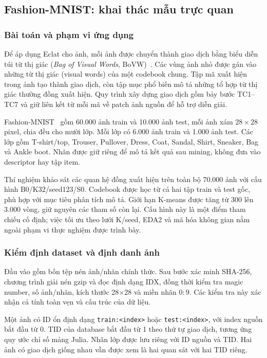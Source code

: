 \subsection{Fashion-MNIST: khai thác mẫu trực quan}
\label{sec:fashion}
\subsubsection{Bài toán và phạm vi ứng dụng}
Để áp dụng Eclat cho ảnh, mỗi ảnh được chuyển thành giao dịch bằng
biểu diễn túi từ thị giác (\textit{Bag of Visual Words}, BoVW)~\cite{Sivic03}.
Các vùng ảnh nhỏ được gán vào những từ thị giác (visual words) của một
codebook chung. Tập mã xuất hiện trong ảnh tạo thành giao dịch, còn tập
mục phổ biến mô tả những tổ hợp từ thị giác thường đồng xuất hiện.
Quy trình xây dựng giao dịch gồm bảy bước TC1--TC7 và giữ liên kết từ
mỗi mã về patch ảnh nguồn để hỗ trợ diễn giải.

Fashion-MNIST~\cite{Xiao2017} gồm 60.000 ảnh train và 10.000 ảnh test,
mỗi ảnh xám $28\times28$ pixel, chia đều cho mười lớp. Mỗi lớp có 6.000
ảnh train và 1.000 ảnh test. Các lớp gồm T-shirt/top, Trouser, Pullover,
Dress, Coat, Sandal, Shirt, Sneaker, Bag và Ankle boot. Nhãn được giữ
riêng để mô tả kết quả sau mining, không đưa vào descriptor hay tập item.

Thí nghiệm khảo sát các quan hệ đồng xuất hiện trên toàn bộ 70.000 ảnh
với cấu hình B0/K32/seed123/S0. Codebook được học từ cả hai tập train và
test gốc, phù hợp với mục tiêu phân tích mô tả. Giới hạn K-means được
tăng từ 300 lên 3.000 vòng, giữ nguyên các tham số còn lại. Cấu hình này
là một điểm tham chiếu cố định; việc tối ưu theo lưới K/seed, EDA2 và
mã hóa không gian nằm ngoài phạm vi thực nghiệm được trình bày.

\subsubsection{Kiểm định dataset và định danh ảnh}
Đầu vào gồm bốn tệp nén ảnh/nhãn chính thức. Sau bước xác minh SHA-256,
chương trình giải nén gzip và đọc định dạng IDX, đồng thời kiểm tra
magic number, số ảnh/nhãn, kích thước 28$\times$28 và miền nhãn $0{:}9$.
Các kiểm tra này xác nhận cả tính toàn vẹn và cấu trúc của dữ liệu.

Một ảnh có ID ổn định dạng \texttt{train:<index>} hoặc
\texttt{test:<index>}, với index nguồn bắt đầu từ 0. TID của database bắt
đầu từ 1 theo thứ tự giao dịch, tương ứng quy ước chỉ số mảng Julia.
Nhãn lớp được lưu riêng với ID nguồn và TID. Hai ảnh có giao dịch giống
nhau vẫn được xem là hai quan sát với hai TID riêng.

